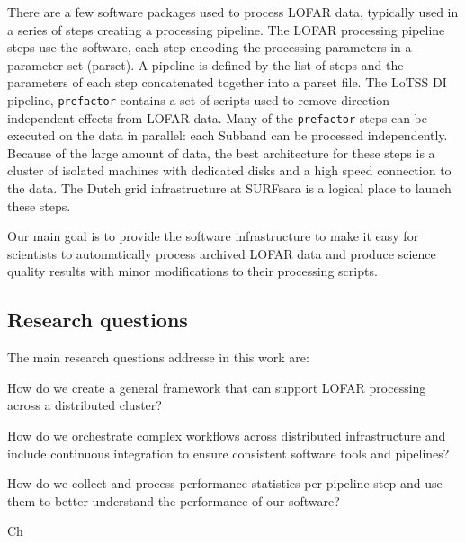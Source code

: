 There are a few software packages used to process LOFAR data, typically used in a series of steps creating a processing pipeline. The LOFAR processing pipeline steps use the software, each step encoding the processing parameters in a parameter-set (parset). A pipeline is defined by the list of steps and the parameters of each step concatenated together into a parset file. The LoTSS DI pipeline, \texttt{prefactor} contains a set of scripts used to remove direction independent effects from LOFAR data. Many of the \texttt{prefactor} steps can be executed on the data in parallel: each Subband can be processed independently. Because of the large amount of data, the best architecture for these steps is a cluster of isolated machines with dedicated disks and a high speed connection to the data. The Dutch grid infrastructure at SURFsara is a logical place to launch these steps. 

Our main goal is to provide the software infrastructure to make it easy for scientists to automatically process archived LOFAR data and produce science quality results with minor modifications to their processing scripts.

\subsection{Research questions}

The main research questions addresse in this work are:

How do we create a general framework that can support LOFAR processing across a distributed cluster?

How do we orchestrate complex workflows across distributed infrastructure and include continuous integration to ensure consistent software tools and pipelines?

How do we collect and process performance statistics per pipeline step and use them to better understand the performance of our software?

Ch






